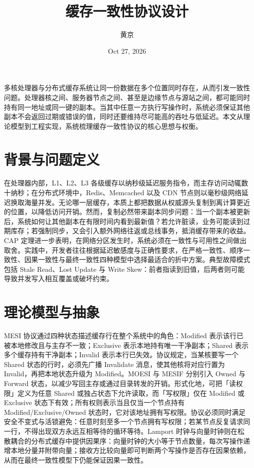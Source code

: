\title{缓存一致性协议设计}
\author{黄京}
\date{Oct 27, 2026}
\maketitle
多核处理器与分布式缓存系统让同一份数据在多个位置同时存在，从而引发一致性问题。处理器核之间、服务器节点之间、甚至是边缘节点与源站之间，都可能同时持有同一地址或同一键的副本。当其中任意一方执行写操作时，系统必须保证其他副本不会返回过期或错误的值，同时还要维持尽可能高的吞吐与低延迟。本文从理论模型到工程实现，系统梳理缓存一致性协议的核心思想与权衡。\par
\chapter{背景与问题定义}
在处理器内部，L1、L2、L3 各级缓存以纳秒级延迟服务指令，而主存访问动辄数十纳秒；在分布式环境中，Redis、Memcached 以及 CDN 节点则以毫秒级网络延迟换取海量并发。无论哪一层缓存，本质上都把数据从权威源头复制到离计算更近的位置，以降低访问开销。然而，复制必然带来副本同步问题：当一个副本被更新后，系统如何让其他副本在有限时间内看到最新值？若允许脏读，业务可能读到过期库存；若强制同步，又会引入额外网络往返或总线事务，抵消缓存带来的收益。CAP 定理进一步表明，在网络分区发生时，系统必须在一致性与可用性之间做出取舍。实践中，开发者往往根据延迟敏感度与正确性要求，在严格一致性、顺序一致性、因果一致性与最终一致性四种模型中选择最适合的折中方案。典型故障模式包括 Stale Read、Lost Update 与 Write Skew：前者指读到旧值，后两者则可能导致并发写入相互覆盖或破坏约束。\par
\chapter{理论模型与抽象}
MESI 协议通过四种状态描述缓存行在整个系统中的角色：Modified 表示该行已被本地修改且与主存不一致；Exclusive 表示本地持有唯一干净副本；Shared 表示多个缓存持有干净副本；Invalid 表示本行已失效。协议规定，当某核要写一个 Shared 状态的行时，必须先广播 Invalidate 消息，使其他核将对应行置为 Invalid，再把本地状态升级为 Modified。MOESI 与 MESIF 分别引入 Owned 与 Forward 状态，以减少写回主存或通过目录转发的开销。形式化地，可把「读权限」定义为任意 Shared 或独占状态下允许读取，而「写权限」仅在 Modified 或 Exclusive 状态下有效；所有权则表示当且仅当一个节点持有 Modified/Exclusive/Owned 状态时，它对该地址拥有写权限。协议必须同时满足安全不变式与活锁避免：任意时刻至多一个节点拥有写权限；若某节点反复请求同一行，不得出现双方永远互相等待的循环等待。Lamport 时钟与向量时钟则在松散耦合的分布式缓存中提供因果序：向量时钟的大小等于节点数量，每次写操作递增本地分量并附带向量；接收方比较向量即可判断两个写操作是否存在因果依赖，从而在最终一致性模型下仍能保证因果一致性。\par
